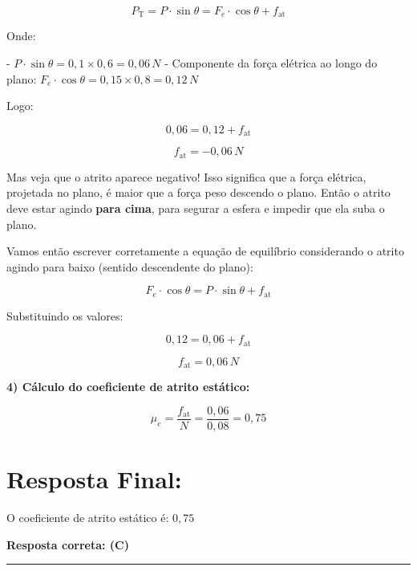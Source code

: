 \documentclass[a4paper,12pt]{article}
\begin{document}
\begin{flushleft}
\[
P_{\text{T}} = P \cdot \sin\theta = F_e \cdot \cos\theta + f_{\text{at}}
\]

Onde:

- $P \cdot \sin\theta = 0{,}1 \times 0{,}6 = 0{,}06\,N$
- Componente da força elétrica ao longo do plano: $F_e \cdot \cos\theta = 0{,}15 \times 0{,}8 = 0{,}12\,N$

Logo:

\[
0{,}06 = 0{,}12 + f_{\text{at}}
\]

\[
f_{\text{at}} = -0{,}06\,N
\]

\colorbox{yellow!20}{Mas veja que o atrito aparece negativo!} Isso significa que a força elétrica, projetada no plano, é maior que 
a força peso descendo o plano. Então o atrito deve estar agindo \textbf{para cima}, para segurar a esfera e impedir que ela suba o plano.

Vamos então escrever corretamente a equação de equilíbrio considerando o atrito agindo para baixo (sentido descendente do plano):

\[
\boxed{
F_e \cdot \cos\theta = P \cdot \sin\theta + f_{\text{at}}
}
\]

Substituindo os valores:

\[
0{,}12 = 0{,}06 + f_{\text{at}}
\]

\[
f_{\text{at}} = 0{,}06\,N
\]

\textbf{4) Cálculo do coeficiente de atrito estático:}

\[
\mu_e = \frac{f_{\text{at}}}{N} = \frac{0{,}06}{0{,}08} = 0{,}75
\]

\section*{Resposta Final:}

O coeficiente de atrito estático é: $\boxed{0{,}75}$

\textbf{Resposta correta: \colorbox{green!50}{(C)}}

\end{flushleft}

\noindent\rule{\linewidth}{0.6pt}\\
\end{document}
